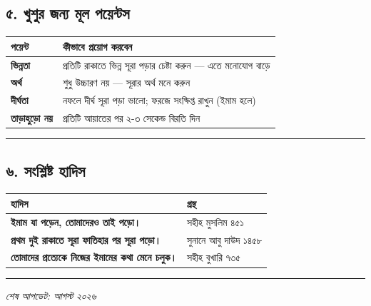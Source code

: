 \subsection*{৫. খুশুর জন্য মূল পয়েন্টস}

\begin{table}[h]\centering\small
\begin{tabular}{ll}
পয়েন্ট & কীভাবে প্রয়োগ করবেন \\
\hline
\textbf{ভিন্নতা} & প্রতিটি রাকাতে ভিন্ন সূরা পড়ার চেষ্টা করুন — এতে মনোযোগ বাড়ে \\
\textbf{অর্থ} & শুধু উচ্চারণ নয় — সূরার অর্থ মনে করুন \\
\textbf{দীর্ঘতা} & নফলে দীর্ঘ সূরা পড়া ভালো; ফরজে সংক্ষিপ্ত রাখুন (ইমাম হলে) \\
\textbf{তাড়াহুড়ো নয়} & প্রতিটি আয়াতের পর ২-৩ সেকেন্ড বিরতি দিন \\
\hline
\end{tabular}
\end{table}

\medskip\hrule\medskip

\subsection*{৬. সংশ্লিষ্ট হাদিস}

\begin{table}[h]\centering\small
\begin{tabular}{ll}
হাদিস & গ্রন্থ \\
\hline
\textbf{\lat{“}ইমাম যা পড়েন, তোমাদেরও তাই পড়ো।\lat{”}} & সহীহ মুসলিম ৪৫১ \\
\textbf{\lat{“}প্রথম দুই রাকাতে সূরা ফাতিহার পর সূরা পড়ো।\lat{”}} & সুনানে আবু দাউদ ১৪৫৮ \\
\textbf{\lat{“}তোমাদের প্রত্যেকে নিজের ইমামের কথা মেনে চলুক।\lat{”}} & সহীহ বুখারি ৭৩৫ \\
\hline
\end{tabular}
\end{table}

\medskip\hrule\medskip

\textit{শেষ আপডেট: আগস্ট ২০২৬}



